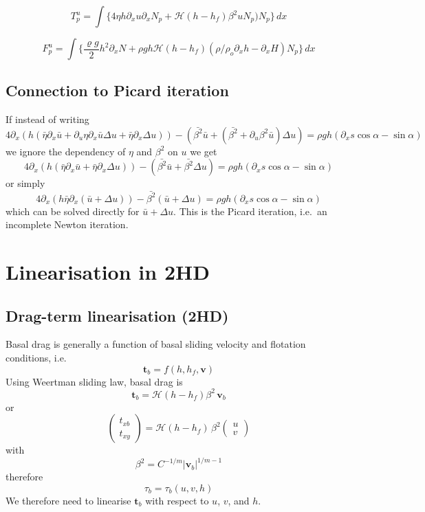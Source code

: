 \documentclass[10pt,a4paper]{book}
\newcommand{\He}{\mathcal{H}}
\newcommand{\p}{\partial}
\begin{document}
\[
T^u_p=\int \{ 4 \eta h \p_x u \p_x N_p + \He(h-h_f) \beta^2 u  N_p ) N_p \} \, dx 
\]

\[
F^u_p=\int \{   \frac{\varrho g}{2}  h^2 \p_x N 
+ \rho g h \He(h-h_f) (\rho/\rho_o \p_x h - \p_x H) N_p \} \, dx 
\]



\subsection{Connection to Picard iteration}
If instead of writing
\[
4 \p_x (h (\bar{\eta} \p_x \bar{u} + \p_u \eta \p_x \bar{u} \Delta u + \bar{\eta} \p_x \Delta u))
-(\bar{\beta^2} \bar{u} + (\bar{\beta^2}  +\p_u \beta^2 \bar{u} ) \Delta u)
 = \rho g h (\p_x s \cos \alpha  -  \sin \alpha )
\]
we ignore the dependency of $\eta$ and $\beta^2$ on $u$ we get
\[
4 \p_x (h (\bar{\eta} \p_x \bar{u} + \bar{\eta} \p_x \Delta u))
-(\bar{\beta^2} \bar{u} + \bar{\beta^2}  \Delta u)
 = \rho g h (\p_x s \cos \alpha  -  \sin \alpha )
\]
or simply
\[
4 \p_x (h \bar{\eta} \p_x (\bar{u}+\Delta u))
-\bar{\beta^2} (\bar{u}+\Delta u)
 = \rho g h (\p_x s \cos \alpha  -  \sin \alpha )
\]
which can be  solved directly for $\bar{u}+\Delta u$. This is the Picard
iteration, i.e.\ an incomplete Newton iteration.


\section{Linearisation in 2HD}


\subsection{Drag-term linearisation (2HD)}

Basal drag is generally a function of basal sliding velocity and flotation conditions, i.e.\
\[
\bm{t}_b=  f(h,h_f,\bm{v})
\]
Using Weertman sliding law, basal drag is 
\[ 
\bm{t}_b= \He(h-h_f) \beta^2 \, \bm{v}_b
\]
or
\begin{equation}
\begin{pmatrix} t_{xb}  \\ t_{xy} \end{pmatrix}
=\He(h-h_f) \, \beta^2
\begin{pmatrix} u  \\ v \end{pmatrix}
\end{equation}
with
\[
\beta^2 =  C^{-1/m} | \bm{v}_b|^{1/m-1} 
\]
therefore
\[
 \tau_b=\tau_b(u,v,h)
\]
We therefore need to linearise $\bm{t}_b$ with respect to $u$, $v$, and
$h$. 
\end{document}
